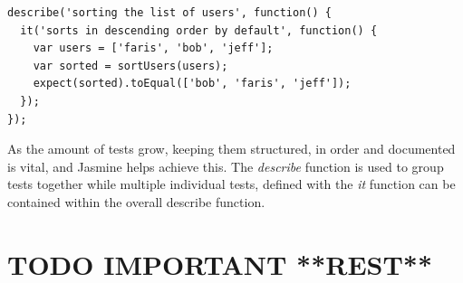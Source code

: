 \begin{lstlisting}[caption=Test Definition with Jasmine]
describe('sorting the list of users', function() {
  it('sorts in descending order by default', function() {
    var users = ['faris', 'bob', 'jeff'];
    var sorted = sortUsers(users);
    expect(sorted).toEqual(['bob', 'faris', 'jeff']);
  });
});
\end{lstlisting}

As the amount of tests grow, keeping them structured, in order and documented is vital, and Jasmine helps achieve this. The \textit{describe} function is used to group tests together while multiple individual tests, defined with the \textit{it} function can be contained within the overall describe function.

\section{TODO IMPORTANT **REST**}